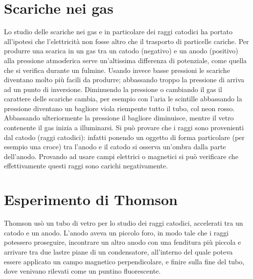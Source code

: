 \section{Scariche nei gas}
Lo studio delle scariche nei gas e in particolare dei raggi catodici ha portato all'ipotesi che l'elettricità non fosse altro che il trasporto di particelle cariche. Per produrre una scarica in un gas tra un catodo (negativo) e un anodo (positivo) alla pressione atmosferica serve un'altissima differenza di potenziale, come quella che si verifica durante un fulmine. Usando invece basse pressioni le scariche diventano molto più facili da produrre; abbassando troppo la pressione di arriva ad un punto di inversione. Diminuendo la pressione o cambiando il gas il carattere delle scariche cambia, per esempio con l'aria le scintille abbassando la pressione diventano un bagliore viola riempente tutto il tubo, col neon rosso. Abbassando ulteriormente la pressione il bagliore diminuisce, mentre il vetro contenente il gas inizia a illuminarsi. Si può provare che i raggi sono provenienti dal catodo (raggi catodici): infatti ponendo un oggetto di forma particolare (per esempio una croce) tra l'anodo e il catodo si osserva un'ombra dalla parte dell'anodo. Provando ad usare campi elettrici o magnetici si può verificare che effettivamente questi raggi sono carichi negativamente.
\section{Esperimento di Thomson}
Thomson usò un tubo di vetro per lo studio dei raggi catodici, accelerati tra un catodo e un anodo. L'anodo aveva un piccolo foro, in modo tale che i raggi potessero proseguire, incontrare un altro anodo con una fenditura più piccola e arrivare tra due lastre piane di un condensatore, all'interno del quale poteva essere applicato un campo magnetico perpendicolare, e finire sulla fine del tubo, dove venivano rilevati come un puntino fluorescente.

